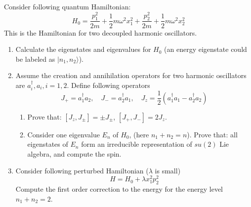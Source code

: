 \begin{exercise}
\label{physics:2022:2}
Consider following quantum Hamiltonian:
\begin{equation}
    H_0 = \frac{p_1^2}{2m} + \frac{1}{2}m\omega^2 x_1^2 + \frac{p_2^2}{2m} + \frac{1}{2}m\omega^2 x_2^2
\end{equation}
This is the Hamiltonian for two decoupled harmonic oscillators.

\begin{enumerate}[label=(\alph*)]
    \item Calculate the eigenstates and eigenvalues for $H_0$ (an energy eigenstate could be labeled as $|n_1, n_2\rangle$).
    \item Assume the creation and annihilation operators for two harmonic oscillators are $a_i^\dagger, a_i, i=1,2$. Define following operators
    \begin{equation}
        J_+ = a_1^\dagger a_2, \quad J_- = a_2^\dagger a_1, \quad J_z = \frac{1}{2}(a_1^\dagger a_1 - a_2^\dagger a_2)
    \end{equation}
    \begin{enumerate}[label=\roman*.]
        \item Prove that: $[J_z, J_\pm] = \pm J_\pm$, $[J_+, J_-] = 2J_z$.
        \item Consider one eigenvalue $E_n$ of $H_0$, (here $n_1 + n_2 = n$). Prove that: all eigenstates of $E_n$ form an irreducible representation of $su(2)$ Lie algebra, and compute the spin.
    \end{enumerate}
    \item Consider following perturbed Hamiltonian ($\lambda$ is small)
    \begin{equation}
        H = H_0 + \lambda x_1^2 p_2^2
    \end{equation}
    Compute the first order correction to the energy for the energy level $n_1 + n_2 = 2$.
\end{enumerate}
\end{exercise}

